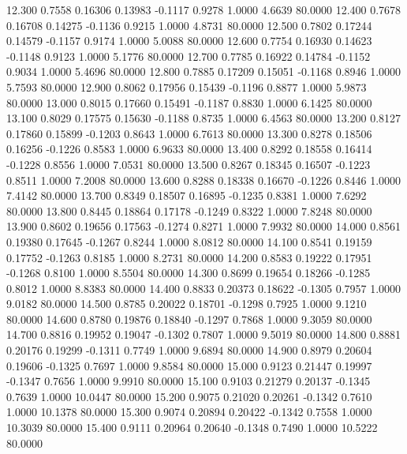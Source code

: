   12.300   0.7558   0.16306   0.13983  -0.1117   0.9278   1.0000   4.6639  80.0000
  12.400   0.7678   0.16708   0.14275  -0.1136   0.9215   1.0000   4.8731  80.0000
  12.500   0.7802   0.17244   0.14579  -0.1157   0.9174   1.0000   5.0088  80.0000
  12.600   0.7754   0.16930   0.14623  -0.1148   0.9123   1.0000   5.1776  80.0000
  12.700   0.7785   0.16922   0.14784  -0.1152   0.9034   1.0000   5.4696  80.0000
  12.800   0.7885   0.17209   0.15051  -0.1168   0.8946   1.0000   5.7593  80.0000
  12.900   0.8062   0.17956   0.15439  -0.1196   0.8877   1.0000   5.9873  80.0000
  13.000   0.8015   0.17660   0.15491  -0.1187   0.8830   1.0000   6.1425  80.0000
  13.100   0.8029   0.17575   0.15630  -0.1188   0.8735   1.0000   6.4563  80.0000
  13.200   0.8127   0.17860   0.15899  -0.1203   0.8643   1.0000   6.7613  80.0000
  13.300   0.8278   0.18506   0.16256  -0.1226   0.8583   1.0000   6.9633  80.0000
  13.400   0.8292   0.18558   0.16414  -0.1228   0.8556   1.0000   7.0531  80.0000
  13.500   0.8267   0.18345   0.16507  -0.1223   0.8511   1.0000   7.2008  80.0000
  13.600   0.8288   0.18338   0.16670  -0.1226   0.8446   1.0000   7.4142  80.0000
  13.700   0.8349   0.18507   0.16895  -0.1235   0.8381   1.0000   7.6292  80.0000
  13.800   0.8445   0.18864   0.17178  -0.1249   0.8322   1.0000   7.8248  80.0000
  13.900   0.8602   0.19656   0.17563  -0.1274   0.8271   1.0000   7.9932  80.0000
  14.000   0.8561   0.19380   0.17645  -0.1267   0.8244   1.0000   8.0812  80.0000
  14.100   0.8541   0.19159   0.17752  -0.1263   0.8185   1.0000   8.2731  80.0000
  14.200   0.8583   0.19222   0.17951  -0.1268   0.8100   1.0000   8.5504  80.0000
  14.300   0.8699   0.19654   0.18266  -0.1285   0.8012   1.0000   8.8383  80.0000
  14.400   0.8833   0.20373   0.18622  -0.1305   0.7957   1.0000   9.0182  80.0000
  14.500   0.8785   0.20022   0.18701  -0.1298   0.7925   1.0000   9.1210  80.0000
  14.600   0.8780   0.19876   0.18840  -0.1297   0.7868   1.0000   9.3059  80.0000
  14.700   0.8816   0.19952   0.19047  -0.1302   0.7807   1.0000   9.5019  80.0000
  14.800   0.8881   0.20176   0.19299  -0.1311   0.7749   1.0000   9.6894  80.0000
  14.900   0.8979   0.20604   0.19606  -0.1325   0.7697   1.0000   9.8584  80.0000
  15.000   0.9123   0.21447   0.19997  -0.1347   0.7656   1.0000   9.9910  80.0000
  15.100   0.9103   0.21279   0.20137  -0.1345   0.7639   1.0000  10.0447  80.0000
  15.200   0.9075   0.21020   0.20261  -0.1342   0.7610   1.0000  10.1378  80.0000
  15.300   0.9074   0.20894   0.20422  -0.1342   0.7558   1.0000  10.3039  80.0000
  15.400   0.9111   0.20964   0.20640  -0.1348   0.7490   1.0000  10.5222  80.0000
